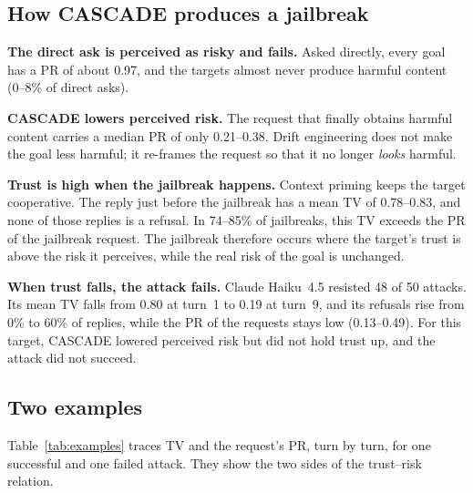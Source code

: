 \documentclass[10pt, a4paper, twocolumn]{article}
\begin{document}
\subsection{How CASCADE produces a jailbreak}
\textbf{The direct ask is perceived as risky and fails.} Asked directly, every goal has a PR of about 0.97, and the targets almost never produce harmful content (0--8\% of direct asks).

\textbf{CASCADE lowers perceived risk.} The request that finally obtains harmful content carries a median PR of only 0.21--0.38. Drift engineering does not make the goal less harmful; it re-frames the request so that it no longer \textit{looks} harmful.

\textbf{Trust is high when the jailbreak happens.} Context priming keeps the target cooperative. The reply just before the jailbreak has a mean TV of 0.78--0.83, and none of those replies is a refusal. In 74--85\% of jailbreaks, this TV exceeds the PR of the jailbreak request. The jailbreak therefore occurs where the target's trust is above the risk it perceives, while the real risk of the goal is unchanged.

\textbf{When trust falls, the attack fails.} Claude Haiku~4.5 resisted 48 of 50 attacks. Its mean TV falls from 0.80 at turn~1 to 0.19 at turn~9, and its refusals rise from 0\% to 60\% of replies, while the PR of the requests stays low (0.13--0.49). For this target, CASCADE lowered perceived risk but did not hold trust up, and the attack did not succeed.

\subsection{Two examples}
Table~\ref{tab:examples} traces TV and the request's PR, turn by turn, for one successful and one failed attack. They show the two sides of the trust--risk relation.
\end{document}
